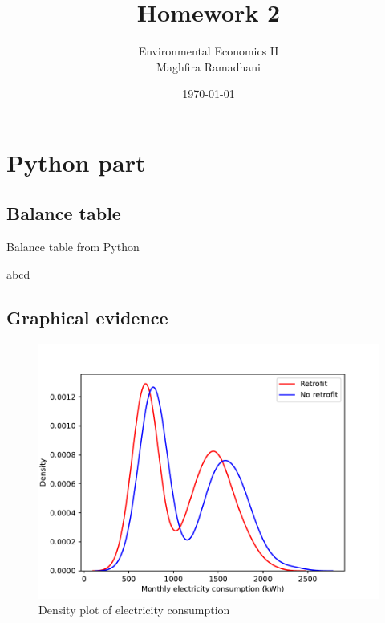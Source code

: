 \documentclass{article}
\begin{document}
 
\title{Homework 2}
\author{Environmental Economics II\\
Maghfira Ramadhani}
\date{\today}
\maketitle

\section{Python part}
\subsection{Balance table}

\begin{table}[H]\centering
\begin{threeparttable}
    \caption{Balance table from Python}
    \label{t1:balance}
    
    \begin{tablenotes}
    \small \item abcd
    \end{tablenotes}
\end{threeparttable}
\end{table}

\subsection{Graphical evidence}

\begin{figure}[H]
    \centering
    \includegraphics[scale = 0.6]{./figure/2_hist.pdf}
    \caption{Density plot of electricity consumption}
    \label{f1:hist}
\end{figure}
\end{document}
